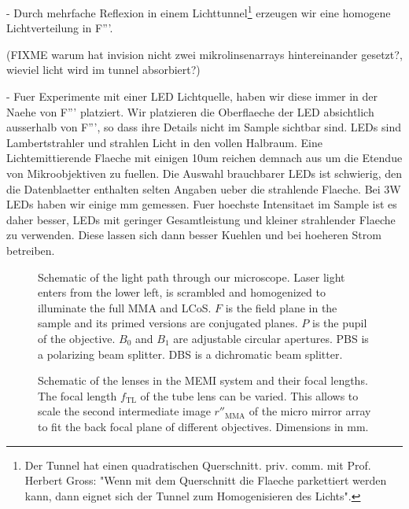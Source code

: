  - Durch mehrfache Reflexion in einem Lichttunnel\footnote{Der Tunnel
   hat einen quadratischen Querschnitt. priv. comm. mit Prof. Herbert
   Gross: "Wenn mit dem Querschnitt die Flaeche parkettiert werden
   kann, dann eignet sich der Tunnel zum Homogenisieren des Lichts".}
   erzeugen wir eine homogene Lichtverteilung in F'''. 
   
   (FIXME warum hat invision nicht zwei mikrolinsenarrays
   hintereinander gesetzt?, wieviel licht wird im tunnel absorbiert?)

 - Fuer Experimente mit einer LED Lichtquelle, haben wir diese immer
   in der Naehe von F''' platziert. Wir platzieren die Oberflaeche der
   LED absichtlich ausserhalb von F''', so dass ihre Details nicht im
   Sample sichtbar sind. LEDs sind Lambertstrahler und strahlen Licht
   in den vollen Halbraum. Eine Lichtemittierende Flaeche mit einigen
   10um reichen demnach aus um die Etendue von Mikroobjektiven zu
   fuellen. Die Auswahl brauchbarer LEDs ist schwierig, den die
   Datenblaetter enthalten selten Angaben ueber die strahlende
   Flaeche. Bei 3W LEDs haben wir einige mm gemessen. Fuer hoechste
   Intensitaet im Sample ist es daher besser, LEDs mit geringer
   Gesamtleistung und kleiner strahlender Flaeche zu verwenden. Diese
   lassen sich dann besser Kuehlen und bei hoeheren Strom betreiben.


\begin{figure}[!htbp]
  \centering
  \caption{Schematic of the light path through our microscope. Laser
    light enters from the lower left, is scrambled and homogenized to
    illuminate the full MMA and LCoS. $F$ is the field plane in the
    sample and its primed versions are conjugated planes. $P$ is the
    pupil of the objective. $B_0$ and $B_1$ are adjustable circular
    apertures. PBS is a polarizing beam splitter. DBS is a dichromatic
    beam splitter.}
  \label{fig:memi-real}
\end{figure}

\begin{figure}[!htbp]
   \centering
   \caption{Schematic of the lenses in the MEMI system and their focal
     lengths. The focal length $f_\textrm{TL}$ of the tube lens can be
     varied. This allows to scale the second intermediate image
     $r''_\textrm{MMA}$ of the micro mirror array to fit the back
     focal plane of different objectives. Dimensions in mm.}
   \label{fig:memi-sketch}
 \end{figure}

